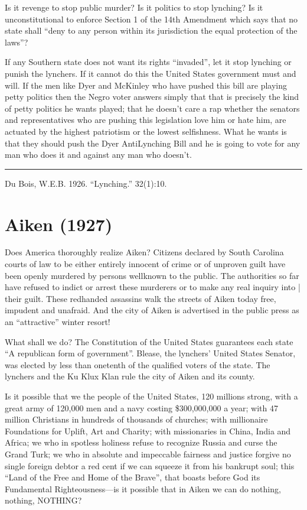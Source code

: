 \documentclass[letterpaper,10pt,english]{jupyterBook}
\begin{document}
\sphinxAtStartPar
Is it revenge to stop public murder? Is it politics to stop lynching? Is it unconstitutional to enforce Section 1 of the 14th Amendment which says that no state shall “deny to any person within its jurisdiction the equal protection of the laws”?

\sphinxAtStartPar
If any Southern state does not want its rights “invaded”, let it stop lynching or punish the lynchers. If it cannot do this the United States government must and will. If the men like Dyer and McKinley who have pushed this bill are playing petty politics then the Negro voter answers simply that that is precisely the kind of petty politics he wants played; that he doesn’t care a rap whether the senators and representatives who are pushing this legislation love him or hate him, are actuated by the highest patriotism or the lowest selfishness. What he wants is that they should push the Dyer Anti\sphinxhyphen{}Lynching Bill and he is going to vote for any man who does it and against any man who doesn’t.


\bigskip\hrule\bigskip


\sphinxAtStartPar
{} Du Bois, W.E.B. 1926. “Lynching.”  32(1):10.


\section{Aiken (1927)}
\label{\detokenize{Volumes/34/01/aiken:aiken-1927}}\label{\detokenize{Volumes/34/01/aiken::doc}}
\sphinxAtStartPar
Does America thoroughly realize Aiken? Citizens declared by South Carolina courts of law to be either entirely innocent of crime or of unproven guilt have been openly murdered by persons well\sphinxhyphen{}known to the public. The authorities so far have refused to indict or arrest these murderers or to make any real inquiry into | their guilt. These red\sphinxhyphen{}handed assassins walk the streets of Aiken today free, impudent and unafraid. And the city of Aiken is advertised in the public press as an “attractive” winter resort!

\sphinxAtStartPar
What shall we do? The Constitution of the United States guarantees each state “A republican form of government”. Blease, the lynchers’ United States Senator, was elected by less than one\sphinxhyphen{}tenth of the qualified voters of the state. The lynchers and the Ku Klux Klan rule the city of Aiken and its county.

\sphinxAtStartPar
Is it possible that we the people of the United States, 120 millions strong, with a great army of 120,000 men and a navy costing \$300,000,000 a year; with 47 million Christians in hundreds of thousands of churches; with millionaire Foundations for Uplift, Art and Charity; with missionaries in China, India and Africa; we who in spotless holiness refuse to recognize Russia and curse the Grand Turk; we who in absolute and impeccable fairness and justice forgive no single foreign debtor a red cent if we can squeeze it from his bankrupt soul; this “Land of the Free and Home of the Brave”, that boasts before God its Fundamental Righteousness—is it possible that in Aiken we can do nothing, nothing, NOTHING?
\end{document}
